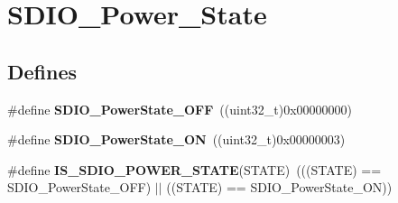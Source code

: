 \hypertarget{group__SDIO__Power__State}{
\section{SDIO\_\-Power\_\-State}
\label{group__SDIO__Power__State}
}
\subsection*{Defines}
\begin{DoxyCompactItemize}
\item 
\hypertarget{group__SDIO__Power__State_gab2f36a68fc50795ea74a7e98b4ac2d37}{
\#define {\bfseries SDIO\_\-PowerState\_\-OFF}~((uint32\_\-t)0x00000000)}
\label{group__SDIO__Power__State_gab2f36a68fc50795ea74a7e98b4ac2d37}

\item 
\hypertarget{group__SDIO__Power__State_ga0aacd8c94effe8066c6d447fc884d217}{
\#define {\bfseries SDIO\_\-PowerState\_\-ON}~((uint32\_\-t)0x00000003)}
\label{group__SDIO__Power__State_ga0aacd8c94effe8066c6d447fc884d217}

\item 
\hypertarget{group__SDIO__Power__State_gad0dae767c2024de1769efb1feccc14ef}{
\#define {\bfseries IS\_\-SDIO\_\-POWER\_\-STATE}(STATE)~(((STATE) == SDIO\_\-PowerState\_\-OFF) $|$$|$ ((STATE) == SDIO\_\-PowerState\_\-ON))}
\label{group__SDIO__Power__State_gad0dae767c2024de1769efb1feccc14ef}

\end{DoxyCompactItemize}
